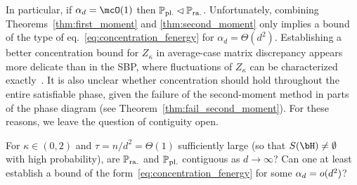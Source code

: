 In particular, if $\alpha_d = \mcO(1)$ then $\mathbb{P}_{\mathrm{pl.}} \lhd \mathbb{P}_{\mathrm{ra.}}$. 
Unfortunately, combining Theorems~\ref{thm:first_moment} and \ref{thm:second_moment} only implies a bound of the type of eq.~\eqref{eq:concentration_fenergy} 
for $\alpha_d = \Theta(d^2)$.
Establishing a better concentration bound for $Z_\kappa$ in average-case matrix discrepancy appears more delicate than in the SBP, 
where fluctuations of $Z_\kappa$ can be characterized exactly~\citep{abbe2022proof}. 
It is also unclear whether concentration should hold throughout the entire satisfiable phase, given the failure of the second-moment method in parts of the phase diagram (see Theorem~\ref{thm:fail_second_moment}). 
For these reasons, we leave the question of contiguity open. 
\begin{openquestion}[Contiguity]\label{op:contiguity}
    For $\kappa \in (0,2)$ and $\tau = n/d^2 = \Theta(1)$ sufficiently large (so that $S(\bH) \neq \emptyset$ with high probability), are $\mathbb{P}_{\mathrm{ra.}}$ and $\mathbb{P}_{\mathrm{pl.}}$ contiguous as $d \to \infty$? 
    Can one at least establish a bound of the form~\eqref{eq:concentration_fenergy} for some $\alpha_d = o(d^2)$?
\end{openquestion}

